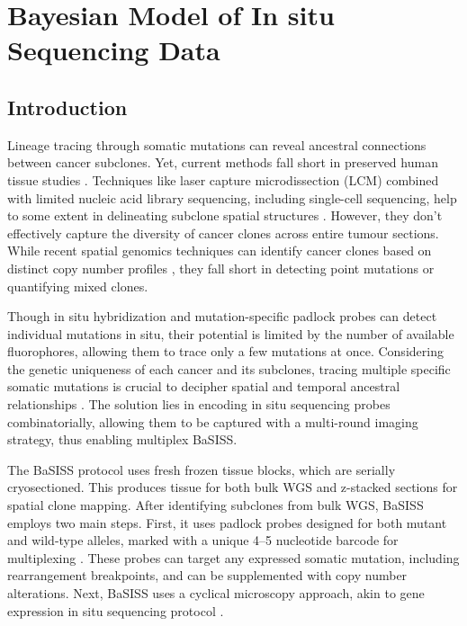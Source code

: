 \chapter{Bayesian Model of In situ Sequencing Data}

\section{Introduction}

Lineage tracing through somatic mutations can reveal ancestral connections between cancer subclones. Yet, current methods fall short in preserved human tissue studies \citep{Yates2015-eg,Jamal-Hanjani2017-ed,Jones2008-tg,Shah2009-lx,Casasent2018-gx,Tarabichi2021-xx}. Techniques like laser capture microdissection (LCM) combined with limited nucleic acid library sequencing, including single-cell sequencing, help to some extent in delineating subclone spatial structures \citep{Shen2000-xj,Casasent2018-gx}. However, they don't effectively capture the diversity of cancer clones across entire tumour sections. While recent spatial genomics techniques can identify cancer clones based on distinct copy number profiles \citep{Zhao2022-dp,Erickson2022-mq}, they fall short in detecting point mutations or quantifying mixed clones.

Though in situ hybridization \citep{Janiszewska2015-kb} and mutation-specific padlock probes \citep{Larsson2010-bp,Grundberg2013-te,Ke2013-km,Baker2017-jz} can detect individual mutations in situ, their potential is limited by the number of available fluorophores, allowing them to trace only a few mutations at once. Considering the genetic uniqueness of each cancer and its subclones, tracing multiple specific somatic mutations is crucial to decipher spatial and temporal ancestral relationships \citep{Nik-Zainal2012-tt}. The solution lies in encoding in situ sequencing probes combinatorially, allowing them to be captured with a multi-round imaging strategy, thus enabling multiplex \ac{BaSISS}.

The \ac{BaSISS} protocol uses fresh frozen tissue blocks, which are serially cryosectioned. This produces tissue for both bulk \ac{WGS} and z-stacked sections for spatial clone mapping. After identifying subclones from bulk WGS, \ac{BaSISS} employs two main steps. First, it uses padlock probes designed for both mutant and wild-type alleles, marked with a unique 4–5 nucleotide barcode for multiplexing \citep{Ke2013-km}. These probes can target any expressed somatic mutation, including rearrangement breakpoints, and can be supplemented with copy number alterations. Next, \ac{BaSISS}  uses a cyclical microscopy approach, akin to gene expression in situ sequencing protocol \citep{Ke2013-km,Svedlund2019-xb}.

